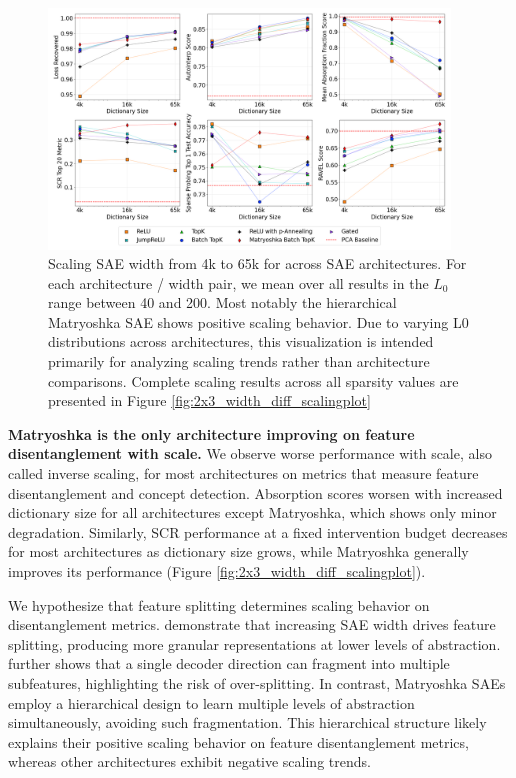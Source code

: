 \documentclass{article}
\theoremstyle{plain}
\theoremstyle{definition}
\theoremstyle{remark}
\begin{document}
\begin{figure}[t]
    \centering
    \includegraphics[width=0.95\textwidth]{images/plot_2x3_sae_bench_gemma-2-2b_scaling_width_series_layer_12.png}
    \caption{Scaling SAE width from 4k to 65k for across SAE architectures. For each architecture / width pair, we mean over all results in the $L_0$ range between 40 and 200. Most notably the hierarchical Matryoshka SAE shows positive scaling behavior. Due to varying L0 distributions across architectures, this visualization is intended primarily for analyzing scaling trends rather than architecture comparisons. Complete scaling results across all sparsity values are presented in Figure \ref{fig:2x3_width_diff_scalingplot}}
    \label{fig:scaling_width_single_trainer_2x3}
\end{figure}

\textbf{Matryoshka is the only architecture improving on feature disentanglement with scale.}
We observe worse performance with scale, also called inverse scaling, for most architectures on metrics that measure feature disentanglement and concept detection. Absorption scores worsen with increased dictionary size for all architectures except Matryoshka, which shows only minor degradation. Similarly, SCR performance at a fixed intervention budget decreases for most architectures as dictionary size grows, while Matryoshka generally improves its performance (Figure \ref{fig:2x3_width_diff_scalingplot}).

We hypothesize that feature splitting determines scaling behavior on disentanglement metrics. \citet{bricken2023monosemanticity} demonstrate that increasing SAE width drives feature splitting, producing more granular representations at lower levels of abstraction. \citet{bussmann2024metasae} further shows that a single decoder direction can fragment into multiple subfeatures, highlighting the risk of over-splitting. In contrast, Matryoshka SAEs employ a hierarchical design to learn multiple levels of abstraction simultaneously, avoiding such fragmentation. This hierarchical structure likely explains their positive scaling behavior on feature disentanglement metrics, whereas other architectures exhibit negative scaling trends.
\end{document}
